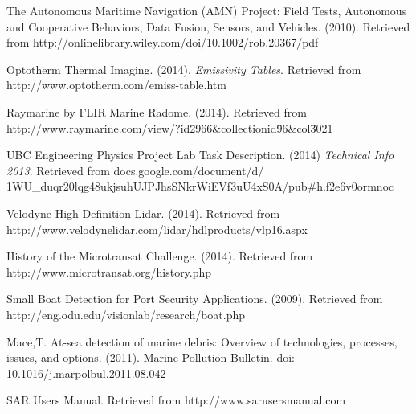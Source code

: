 \begin{thebibliography}{9999999999999999999999999999}


 The Autonomous Maritime Navigation (AMN) Project:
Field Tests, Autonomous and Cooperative Behaviors,
Data Fusion, Sensors, and Vehicles. (2010). Retrieved from http://onlinelibrary.wiley.com/doi/10.1002/rob.20367/pdf

 Optotherm Thermal Imaging. (2014). \textit{Emissivity Tables}. Retrieved from http://www.optotherm.com/emiss-table.htm

 Raymarine by FLIR Marine Radome. (2014). Retrieved from http://www.raymarine.com/view/?id\=2966\&collectionid\=96\&col\=3021

 UBC Engineering Physics Project Lab Task Description. (2014) \textit{Technical Info 2013}. Retrieved from docs.google.com/document/d/\\1WU\_duqr20lqg48ukjsuhUJPJhsSNkrWiEVf3uU4xS0A/pub\#h.f2e6v0ormnoc

 Velodyne High Definition Lidar. (2014). Retrieved from http://www.velodynelidar.com/lidar/hdlproducts/vlp16.aspx

 History of the Microtransat Challenge. (2014). Retrieved from http://www.microtransat.org/history.php

 Small Boat Detection for Port Security Applications. (2009). Retrieved from http://eng.odu.edu/visionlab/research/boat.php

 Mace,T. At-sea detection of marine debris: Overview of technologies, processes, issues, and options. (2011). Marine Pollution Bulletin. doi: 10.1016/j.marpolbul.2011.08.042

 SAR Users Manual. Retrieved from http://www.sarusersmanual.com

\end{thebibliography}